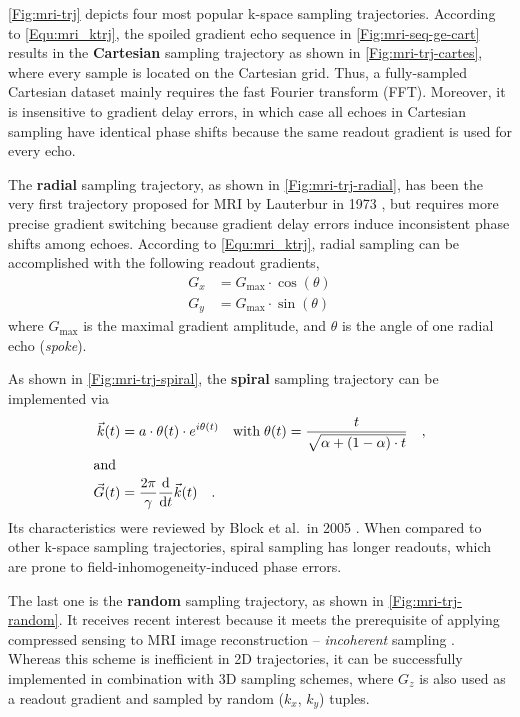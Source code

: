 \cref{Fig:mri-trj} depicts four most popular k-space sampling trajectories. According to \cref{Equ:mri_ktrj}, the spoiled gradient echo sequence in \cref{Fig:mri-seq-ge-cart} results in the \textbf{Cartesian} sampling trajectory as shown in \cref{Fig:mri-trj-cartes}, where every sample is located on the Cartesian grid. Thus, a fully-sampled Cartesian dataset mainly requires the fast Fourier transform (\acs{FFT}). Moreover, it is insensitive to gradient delay errors, in which case all echoes in Cartesian sampling have identical phase shifts because the same readout gradient is used for every echo.

The \textbf{radial} sampling trajectory, as shown in \cref{Fig:mri-trj-radial}, has been the very first trajectory proposed for MRI by Lauterbur in 1973 \cite{1973_Nature}, but requires more precise gradient switching because gradient delay errors induce inconsistent phase shifts among echoes. According to \cref{Equ:mri_ktrj}, radial sampling can be accomplished with the following readout gradients,
\begin{equation} \label{Equ:mri_grad_rad}
  \begin{aligned}
    G_x &= G_{\text{max}} \cdot \cos(\theta) \\
    G_y &= G_{\text{max}} \cdot \sin(\theta)
  \end{aligned}
\end{equation}
where $G_{\text{max}}$ is the maximal gradient amplitude, and $\theta$ is the angle of one radial echo (\textit{spoke}). 

As shown in \cref{Fig:mri-trj-spiral}, the \textbf{spiral} sampling trajectory \cite{1999_spiral} can be implemented via
\begin{align}
  \vec{k}(t) &= a \cdot \theta (t) \cdot e^{i \theta (t)} \quad \text{with} \; \theta (t) = \frac{t}{\sqrt{\alpha + (1 - \alpha) \cdot t}} \quad ,  \label{Equ:mri_grad_spi} \\
\intertext{and}
  \vec{G}(t) &= \frac{2\pi}{\gamma} \frac{\text{d}}{\text{d}t} \vec{k}(t) \quad .
\end{align}
Its characteristics were reviewed by Block et al.~in 2005 \cite{2005_spiral_JMRI}. When compared to other k-space sampling trajectories, spiral sampling has longer readouts, which are prone to field-inhomogeneity-induced phase errors. 

The last one is the \textbf{random} sampling trajectory, as shown in \cref{Fig:mri-trj-random}. It receives recent interest because it meets the prerequisite of applying compressed sensing \cite{2006_CS} to MRI image reconstruction -- \textit{incoherent} sampling \cite{2007_Sparse_MRI}. Whereas this scheme is inefficient in 2D trajectories, it can be successfully implemented in combination with 3D sampling schemes, where $G_z$ is also used as a readout gradient and sampled by random ($k_x$, $k_y$) tuples.







